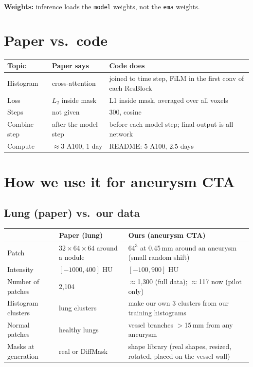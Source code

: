 \documentclass[11pt,a4paper]{article}
\begin{document}
\textbf{Weights:} inference loads the \texttt{model} weights, not the \texttt{ema} weights.

\section{Paper vs.\ code}\label{sec:diff}
\begin{center}
\small
\begin{tabularx}{\linewidth}{lXX}
\toprule
\textbf{Topic} & \textbf{Paper says} & \textbf{Code does} \\
\midrule
Histogram & cross-attention & joined to time step, FiLM in the first conv of each ResBlock \\
Loss & $L_2$ inside mask & L1 inside mask, averaged over all voxels \\
Steps & not given & 300, cosine \\
Combine step & after the model step & before each model step; final output is all network \\
Compute & $\approx$3 A100, 1 day & README: 5 A100, 2.5 days \\
\bottomrule
\end{tabularx}
\end{center}

\section{How we use it for aneurysm CTA}\label{sec:ours}

\subsection{Lung (paper) vs.\ our data}
\begin{center}
\small
\begin{tabularx}{\linewidth}{lXX}
\toprule
 & \textbf{Paper (lung)} & \textbf{Ours (aneurysm CTA)} \\
\midrule
Patch & $32\times64\times64$ around a nodule & $64^3$ at 0.45\,mm around an aneurysm (small random shift) \\
Intensity & $[-1000,400]$ HU & $[-100,900]$ HU \\
Number of patches & 2{,}104 & $\approx$1{,}300 (full data); $\approx$117 now (pilot only) \\
Histogram clusters & lung clusters & make our own 3 clusters from our training histograms \\
Normal patches & healthy lungs & vessel branches $>$15\,mm from any aneurysm \\
Masks at generation & real or DiffMask & shape library (real shapes, resized, rotated, placed on the vessel wall) \\
\bottomrule
\end{tabularx}
\end{center}
\end{document}

